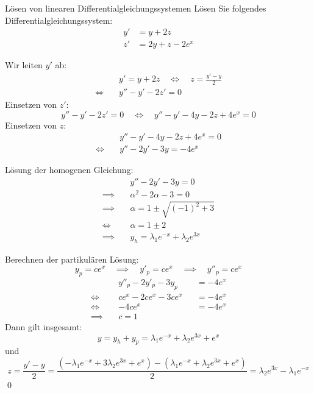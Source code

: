 \documentclass[german]{../spicker}
\begin{document}
\begin{example}{Lösen von linearen Differentialgleichungssystemen}
    Lösen Sie folgendes Differentialgleichungssystem:
    $$
        \begin{aligned}
            y' & = y + 2z          \\
            z' & = 2y + z - 2e^{x}
        \end{aligned}
    $$

    \exampleseparator

    Wir leiten $y'$ ab:
    $$
        \begin{aligned}
                       & y' = y + 2z \quad \iff \quad z = \frac{y'- y}{2} \\
            \iff \quad & y'' - y'  - 2z' = 0
        \end{aligned}
    $$
    Einsetzen von $z'$:
    $$
        y'' - y'  - 2z' = 0 \quad \iff \quad  y'' - y'  - 4y -2z + 4e^{x} = 0
    $$
    Einsetzen von $z$:
    $$
        \begin{aligned}
                       & y'' - y'  - 4y -2z + 4e^{x} = 0 \\
            \iff \quad & y'' - 2y'  - 3y  = -4e^{x}
        \end{aligned}
    $$

    Lösung der homogenen Gleichung:
    $$
        \begin{aligned}
                           & y'' - 2y'  - 3y  = 0                          \\
            \implies \quad & \alpha^2 - 2\alpha - 3 = 0                    \\
            \implies \quad & \alpha = 1 \pm \sqrt{\left( -1 \right)^2 + 3} \\
            \iff \quad     & \alpha = 1 \pm 2                              \\
            \implies \quad & y_h = \lambda_1e^{-x} + \lambda_2e^{3x}
        \end{aligned}
    $$

    Berechnen der partikulären Lösung:
    $$
        y_p = ce^x \quad \implies \quad y'_p = ce^x \quad \implies \quad y''_p = ce^x
    $$
    $$
        \begin{aligned}
                           & y''_p - 2y'_p  - 3y_p &  & = -4e^{x} \\
            \iff \quad     & ce^x - 2ce^x  - 3ce^x &  & = -4e^{x} \\
            \iff \quad     & -4ce^x                &  & = -4e^{x} \\
            \implies \quad & c = 1
        \end{aligned}
    $$
    Dann gilt insgesamt:
    $$
        y = y_h + y_p = \lambda_1e^{-x} + \lambda_2e^{3x} + e^x
    $$
    und
    $$
        z = \frac{y'- y}{2} = \frac{\left( -\lambda_1e^{-x} + 3\lambda_2e^{3x} + e^x \right) - \left( \lambda_1e^{-x} + \lambda_2e^{3x} + e^x \right)}{2} = \lambda_2e^{3x} - \lambda_1e^{-x}
    $$\qed
\end{example}

\printindex
\printindex[Beispiele]
\end{document}
